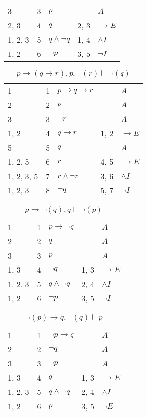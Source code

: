 \documentclass{article}
\begin{document}
\begin{table}[htbp]
\begin{tabular}{lrlll}
{3} & 3 & $p$ & {} & $A$ \\
{2, 3} & 4 & $q$ & {2, 3} & $→E$ \\
{1, 2, 3} & 5 & $q∧ ¬q$ & {1, 4} & $∧I$ \\
{1, 2} & 6 & $¬p$ & {3, 5} & $¬I$ \\
\end{tabular}
\end{table}\begin{table}[htbp]\caption*{$p→(q→r),p,¬(r) ⊢ ¬(q)$}\centering\begin{tabular}{lrlll}
{1} & 1 & $p→q→r$ & {} & $A$ \\
{2} & 2 & $p$ & {} & $A$ \\
{3} & 3 & $¬r$ & {} & $A$ \\
{1, 2} & 4 & $q→r$ & {1, 2} & $→E$ \\
{5} & 5 & $q$ & {} & $A$ \\
{1, 2, 5} & 6 & $r$ & {4, 5} & $→E$ \\
{1, 2, 3, 5} & 7 & $r∧ ¬r$ & {3, 6} & $∧I$ \\
{1, 2, 3} & 8 & $¬q$ & {5, 7} & $¬I$ \\
\end{tabular}
\end{table}\begin{table}[htbp]\caption*{$p→ ¬(q),q ⊢ ¬(p)$}\centering\begin{tabular}{lrlll}
{1} & 1 & $p→ ¬q$ & {} & $A$ \\
{2} & 2 & $q$ & {} & $A$ \\
{3} & 3 & $p$ & {} & $A$ \\
{1, 3} & 4 & $¬q$ & {1, 3} & $→E$ \\
{1, 2, 3} & 5 & $q∧ ¬q$ & {2, 4} & $∧I$ \\
{1, 2} & 6 & $¬p$ & {3, 5} & $¬I$ \\
\end{tabular}
\end{table}\begin{table}[htbp]\caption*{$¬(p)→q,¬(q) ⊢ p$}\centering\begin{tabular}{lrlll}
{1} & 1 & $¬p→q$ & {} & $A$ \\
{2} & 2 & $¬q$ & {} & $A$ \\
{3} & 3 & $¬p$ & {} & $A$ \\
{1, 3} & 4 & $q$ & {1, 3} & $→E$ \\
{1, 2, 3} & 5 & $q∧ ¬q$ & {2, 4} & $∧I$ \\
{1, 2} & 6 & $p$ & {3, 5} & $¬E$ \\
\end{tabular}

\end{table}
\end{document}
